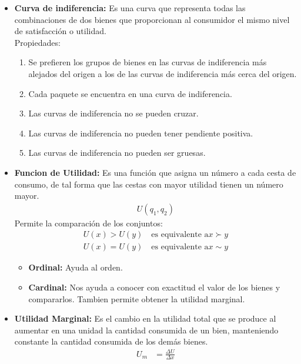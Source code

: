\documentclass{templateNote}
\begin{document}
\begin{itemize}
\begin{enumerate}
    \end{enumerate}

    \item \textbf{Curva de indiferencia:} Es una curva que representa todas las combinaciones de dos bienes que proporcionan al consumidor el mismo nivel de satisfacción o utilidad.\\
    Propiedades:
    \begin{enumerate}
        \item Se prefieren los grupos de bienes en las curvas de indiferencia más
        alejados del origen a los de las curvas de indiferencia más cerca del
        origen.
        
        \item Cada paquete se encuentra en una curva de indiferencia.
        
        \item Las curvas de indiferencia no se pueden cruzar.

        \item Las curvas de indiferencia no pueden tener pendiente positiva.
        
        \item Las curvas de indiferencia no pueden ser gruesas.
    \end{enumerate}

    \item \textbf{Funcion de Utilidad:} Es una función que asigna un número a cada cesta de consumo, de tal forma que las cestas con mayor utilidad tienen un número mayor.
    \begin{align*}
        U(q_1,q_2) 
    \end{align*}
    Permite la comparación de los conjuntos:    
    \begin{align*}
        U(x) > U(y) \quad \text{es equivalente a} x \succ y \\
        U(x) = U(y) \quad \text{es equivalente a} x \sim y
    \end{align*}
    
    \begin{itemize}
        \item \textbf{Ordinal:} Ayuda al orden.
        \item \textbf{Cardinal:} Nos ayuda a conocer con exactitud el valor de los bienes y compararlos. Tambien permite obtener la utilidad marginal.
    \end{itemize}
    \item \textbf{Utilidad Marginal:} Es el cambio en la utilidad total que se produce al aumentar en una unidad la cantidad consumida de un bien, manteniendo constante la cantidad consumida de los demás bienes.
    \begin{align*}
        U_m &= \frac{\Delta U}{\Delta x}
    \end{align*}


\end{itemize}
\end{document}
